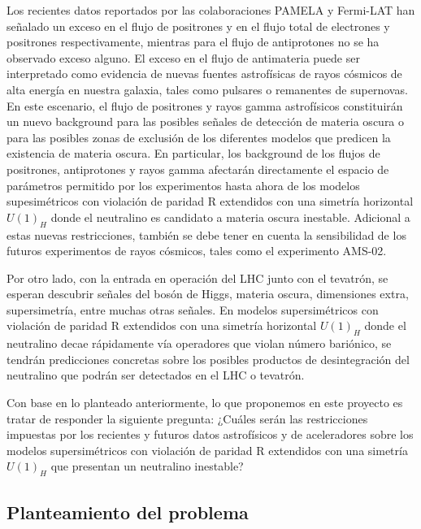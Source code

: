 \documentclass[11pt]{article}
\begin{document}
Los recientes datos reportados por las colaboraciones PAMELA y Fermi-LAT
han señalado un exceso en el flujo de positrones y en el flujo total de
electrones y positrones respectivamente, mientras para el flujo de antiprotones no se
ha observado exceso alguno. El exceso en el flujo de antimateria puede ser
interpretado como evidencia de nuevas fuentes astrofísicas de rayos cósmicos de
alta energía en nuestra galaxia, tales como pulsares o remanentes de supernovas.
En este escenario, el flujo de positrones y rayos gamma astrofísicos constituirán
un nuevo background para las posibles señales de detección de materia oscura o para las posibles zonas
de exclusión de los diferentes modelos que predicen la existencia de materia oscura. En particular,
los background de los flujos de positrones, antiprotones y rayos gamma afectarán directamente
el espacio de parámetros permitido por los experimentos hasta ahora de los modelos
supesimétricos con violación de paridad R extendidos con una simetría horizontal
$U(1)_H$ donde el neutralino es candidato a materia oscura inestable. Adicional a
estas nuevas restricciones, también se debe tener en cuenta la sensibilidad de
los futuros experimentos de rayos cósmicos, tales como el experimento AMS-02.

Por otro lado, con la entrada en operación del LHC junto con el tevatrón,
se esperan descubrir señales del bosón de Higgs, materia oscura, dimensiones extra,
supersimetría, entre muchas otras señales.  En modelos supersimétricos con violación de paridad R
extendidos con una simetría horizontal $U(1)_H$ donde el neutralino decae rápidamente vía operadores
que violan número bariónico, se tendrán predicciones concretas sobre los posibles productos de
desintegración del neutralino que podrán ser detectados en el LHC o tevatrón.

Con base en lo planteado anteriormente, lo que proponemos en este proyecto es
tratar de responder la siguiente pregunta: ¿Cuáles serán las restricciones
impuestas por los recientes y futuros datos astrofísicos y de aceleradores sobre
los modelos supersimétricos con violación de paridad R extendidos con una simetría $U(1)_H$ que presentan un neutralino inestable?

\subsection{Planteamiento del problema}
\end{document}
